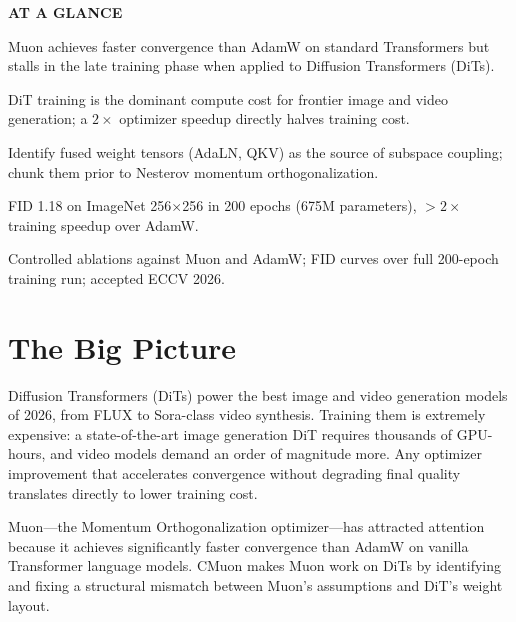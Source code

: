 \documentclass[10pt,twocolumn]{article}
\begin{document}
\begin{mdframed}[backgroundcolor=boxgray,linecolor=rulered,linewidth=1pt,
    innerleftmargin=6pt,innerrightmargin=6pt,
    innertopmargin=6pt,innerbottommargin=6pt]
\textbf{\small AT A GLANCE}\par\vspace{4pt}
\begin{description}[leftmargin=0pt,labelsep=4pt,itemsep=2pt,parsep=0pt,
    font=\small\bfseries]
  \item[Problem:] Muon achieves faster convergence than AdamW on standard Transformers
    but stalls in the late training phase when applied to Diffusion Transformers (DiTs).
  \item[Why it matters:] DiT training is the dominant compute cost for frontier image
    and video generation; a $2\times$ optimizer speedup directly halves training cost.
  \item[Method:] Identify fused weight tensors (AdaLN, QKV) as the source of subspace
    coupling; chunk them prior to Nesterov momentum orthogonalization.
  \item[Result:] FID 1.18 on ImageNet 256$\times$256 in 200 epochs (675M parameters),
    $>2\times$ training speedup over AdamW.
  \item[Evidence:] Controlled ablations against Muon and AdamW; FID curves over full
    200-epoch training run; accepted ECCV 2026.
\end{description}
\end{mdframed}

\section{The Big Picture}

Diffusion Transformers (DiTs) power the best image and video generation models of
2026, from FLUX to Sora-class video synthesis. Training them is extremely expensive:
a state-of-the-art image generation DiT requires thousands of GPU-hours, and video
models demand an order of magnitude more. Any optimizer improvement that accelerates
convergence without degrading final quality translates directly to lower training cost.

Muon---the Momentum Orthogonalization optimizer---has attracted attention because it
achieves significantly faster convergence than AdamW on vanilla Transformer language
models. CMuon makes Muon work on DiTs by identifying and fixing a structural mismatch
between Muon's assumptions and DiT's weight layout.
\end{document}
